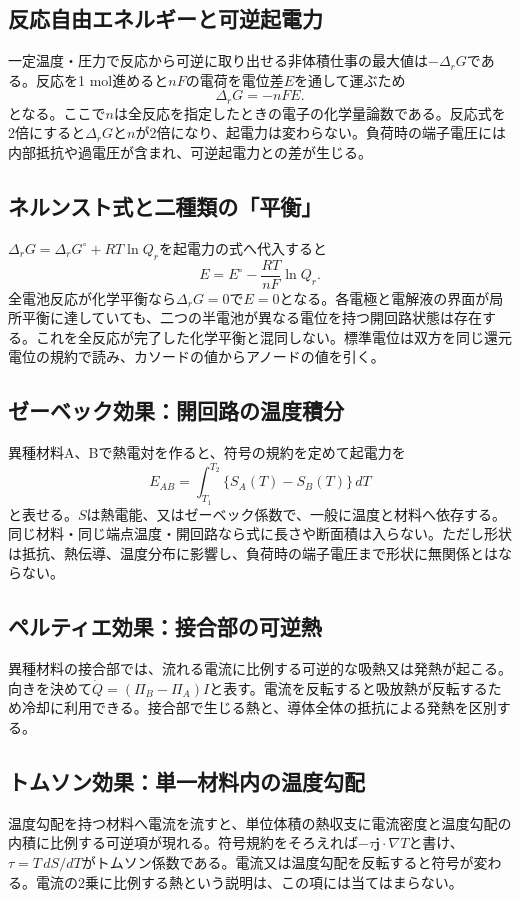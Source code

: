 \subsection{反応自由エネルギーと可逆起電力}
\label{theory:electrochem:gibbs}
一定温度・圧力で反応から可逆に取り出せる非体積仕事の最大値は$-\Delta_rG$である。反応を1 mol進めると$nF$の電荷を電位差$E$を通して運ぶため
\[
 \Delta_rG=-nFE .
\]
となる\cite{openstax_cell_gibbs}。ここで$n$は全反応を指定したときの電子の化学量論数である。反応式を2倍にすると$\Delta_rG$と$n$が2倍になり、起電力は変わらない。負荷時の端子電圧には内部抵抗や過電圧が含まれ、可逆起電力との差が生じる。

\subsection{ネルンスト式と二種類の「平衡」}
\label{theory:electrochem:nernst}
$\Delta_rG=\Delta_rG^\circ+RT\ln Q_r$を起電力の式へ代入すると
\[
 E=E^\circ-\frac{RT}{nF}\ln Q_r .
\]
全電池反応が化学平衡なら$\Delta_rG=0$で$E=0$となる。各電極と電解液の界面が局所平衡に達していても、二つの半電池が異なる電位を持つ開回路状態は存在する。これを全反応が完了した化学平衡と混同しない。標準電位は双方を同じ還元電位の規約で読み、カソードの値からアノードの値を引く。

\subsection{ゼーベック効果：開回路の温度積分}
\label{theory:electrochem:seebeck}
異種材料A、Bで熱電対を作ると、符号の規約を定めて起電力を
\[
 E_{AB}=\int_{T_1}^{T_2}\{S_A(T)-S_B(T)\}\,dT
\]
と表せる\cite{mit_thermoelectric2024}。$S$は熱電能、又はゼーベック係数で、一般に温度と材料へ依存する。同じ材料・同じ端点温度・開回路なら式に長さや断面積は入らない。ただし形状は抵抗、熱伝導、温度分布に影響し、負荷時の端子電圧まで形状に無関係とはならない。

\subsection{ペルティエ効果：接合部の可逆熱}
\label{theory:electrochem:peltier}
異種材料の接合部では、流れる電流に比例する可逆的な吸熱又は発熱が起こる。向きを決めて$\dot Q=(\Pi_B-\Pi_A)I$と表す。電流を反転すると吸放熱が反転するため冷却に利用できる。接合部で生じる熱と、導体全体の抵抗による発熱を区別する。

\subsection{トムソン効果：単一材料内の温度勾配}
\label{theory:electrochem:thomson}
温度勾配を持つ材料へ電流を流すと、単位体積の熱収支に電流密度と温度勾配の内積に比例する可逆項が現れる。符号規約をそろえれば$-\tau\boldsymbol j\cdot\nabla T$と書け、$\tau=T\,dS/dT$がトムソン係数である。電流又は温度勾配を反転すると符号が変わる。電流の2乗に比例する熱という説明は、この項には当てはまらない\cite{mit_thermoelectric2024}。


